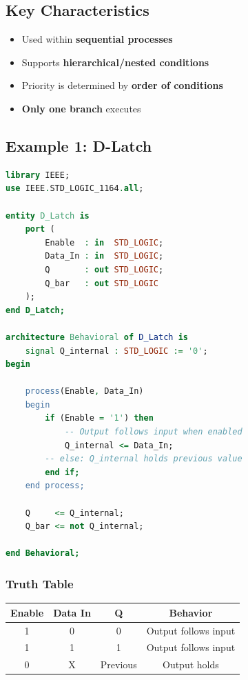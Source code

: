 \documentclass[12pt,a4paper]{article}
\begin{document}
\subsection{Key Characteristics}
\begin{itemize}
    \item Used within \textbf{sequential processes}
    \item Supports \textbf{hierarchical/nested conditions}
    \item Priority is determined by \textbf{order of conditions}
    \item \textbf{Only one branch} executes
\end{itemize}

\subsection{Example 1: D-Latch}

\begin{lstlisting}[language=VHDL]
library IEEE;
use IEEE.STD_LOGIC_1164.all;

entity D_Latch is
    port (
        Enable  : in  STD_LOGIC;
        Data_In : in  STD_LOGIC;
        Q       : out STD_LOGIC;
        Q_bar   : out STD_LOGIC
    );
end D_Latch;

architecture Behavioral of D_Latch is
    signal Q_internal : STD_LOGIC := '0';
begin
    
    process(Enable, Data_In)
    begin
        if (Enable = '1') then
            -- Output follows input when enabled
            Q_internal <= Data_In;
        -- else: Q_internal holds previous value
        end if;
    end process;
    
    Q     <= Q_internal;
    Q_bar <= not Q_internal;
    
end Behavioral;
\end{lstlisting}

\subsubsection{Truth Table}

\begin{table}[h]
\centering
\begin{tabular}{|c|c|c|c|}
\hline
\textbf{Enable} & \textbf{Data In} & \textbf{Q} & \textbf{Behavior} \\
\hline
1 & 0 & 0 & Output follows input \\
\hline
1 & 1 & 1 & Output follows input \\
\hline
0 & X & Previous & Output holds \\
\hline
\end{tabular}
\end{table}
\end{document}
